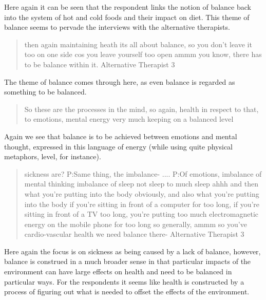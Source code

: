 Here again it can be seen that the respondent links the notion of balance back into the system of hot and cold foods and their impact on diet. This theme of balance seems to pervade the interviews with the alternative therapists. 

\begin{quotation}
then again maintaining heath its all about balance, so you don't leave it too on one side cos you leave yourself too open ammm you know, there has to be balance within it.
Alternative Therapist 3
\end{quotation}

The theme of balance comes through here, as even balance is regarded as something to be balanced. 


\begin{quotation}
   So these are the processes in the mind, so again, health in respect to that, to emotions, mental energy very much keeping on a balanced level

\end{quotation}

Again we see that balance is to be achieved between emotions and mental thought, expressed in this language of energy (while using quite physical metaphors, level, for instance). 

\begin{quotation}
  sickness are?
P:Same thing, the imbalance-
....
P:Of emotions, imbalance of mental thinking imbalance of sleep not sleep to much sleep ahhh and then what you're putting into the body obviously, and also what you're putting into the body if you're sitting in front of a computer for too long, if you're sitting in front of a TV too long, you're putting too much electromagnetic energy on the mobile phone for too long so generally, ammm so you've cardio-vascular health we need balance there-
Alternative Therapist 3
\end{quotation}

Here again the focus is on sickness as being caused by a lack of balance, however, balance is construed in a much broader sense in that particular impacts of the environment can have large effects on health and need to be balanced in particular ways. For the respondents it seems like health is constructed by a process of figuring out what is needed to offset the effects of the environment. 



